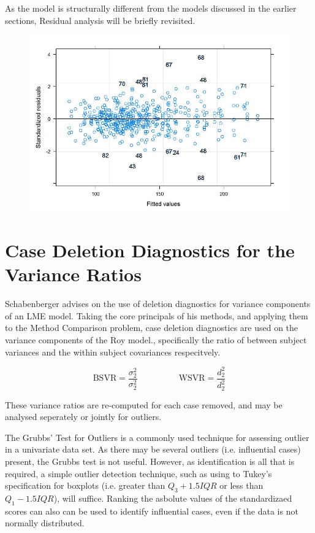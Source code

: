 \documentclass[12pt, a4paper]{report}
\theoremstyle{plain}
\theoremstyle{definition}
\theoremstyle{remark}
\begin{document}
As the model is structurally different from the models discussed in the earlier sections, Residual analysis will be briefly revisited.
\begin{figure}[h!]
	\centering
	\includegraphics[width=0.7\linewidth]{images/Residuals-JS-Roy}
	\caption{}
	\label{fig:Residuals-JS-Roy}
\end{figure}

\newpage
\section{Case Deletion Diagnostics for the Variance Ratios}

Schabenberger advises on the use of deletion diagnostics for variance components of an LME model.
Taking the core principals of his methods, and applying them to the Method Comparison problem, case deletion diagnostics are used on the variance components of the Roy model., specifically the ratio of between subject variances and the within subject covariances respecitvely.


\[ \mbox{BSVR} = \frac{\sigma^2_2}{\sigma^2_2} \phantom{makespace}  \mbox{WSVR} = \frac{d^2_2}{d^2_2} \]

These variance ratios are re-computed for each case removed, and may be analysed seperately or jointly for outliers. 

The Grubbs' Test for Outliers is a commonly used technique for assessing outlier in a univariate data set. As there may be several outliers (i.e. influential cases) present, the Grubbs test is not useful. However, as identification is all that is required, a simple outlier detection technique, such as using to Tukey's specification for boxplots (i.e. greater than $Q_3 +1.5 IQR$ or less than $Q_1 - 1.5 IQR$), will suffice. Ranking the asbolute values of the standardizaed scores can also can be used to identify influential cases, even if the data is not normally distributed.
\end{document}
